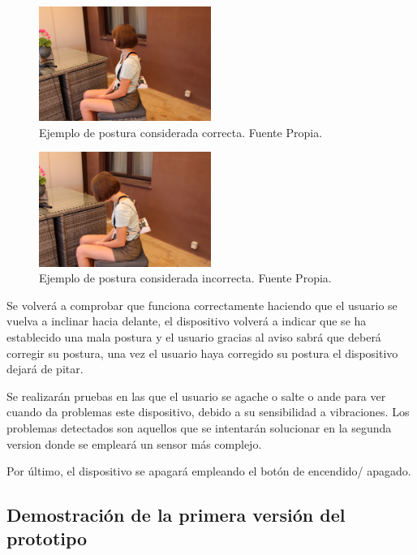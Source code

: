 \begin{figure}[h!]
    \centering
    \includegraphics[width=0.5\textwidth]{img/V1_PosCor.jpg}
    \caption{Ejemplo de postura considerada correcta. Fuente Propia.}
    \label{fig:imgV1_posturaCorr} 
\end{figure}

\begin{figure}[h!]
    \centering
    \includegraphics[width=0.5\textwidth]{img/V1_PosInc.jpg}
    \caption{Ejemplo de postura considerada incorrecta. Fuente Propia.}
    \label{fig:imgV1_posturaInc} 
\end{figure}


Se volverá a comprobar que funciona correctamente haciendo que el usuario se vuelva a inclinar hacia delante, el dispositivo volverá a indicar que se ha establecido una mala postura y el usuario gracias al aviso sabrá que deberá corregir su postura, una vez el usuario haya corregido su postura el dispositivo dejará de pitar.

Se realizarán pruebas en las que el usuario se agache o salte o ande para ver cuando da problemas este dispositivo, debido a su sensibilidad a vibraciones. Los problemas detectados son aquellos que se intentarán solucionar en la segunda version donde se empleará un sensor más complejo.

Por último, el dispositivo se apagará empleando el botón de encendido/ apagado.


\subsection{Demostración de la primera versión del prototipo}

